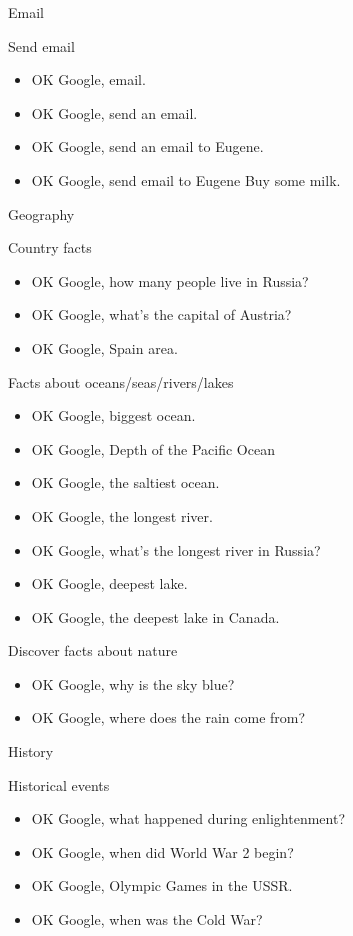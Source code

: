 \documentclass[
  a4paper,
]{article}
\begin{document}
Email

Send email

\begin{itemize}
\item
  OK Google, email.
\item
  OK Google, send an email.
\item
  OK Google, send an email to Eugene.
\item
  OK Google, send email to Eugene Buy some milk.
\end{itemize}

Geography

Country facts

\begin{itemize}
\item
  OK Google, how many people live in Russia?
\item
  OK Google, what's the capital of Austria?
\item
  OK Google, Spain area.
\end{itemize}

Facts about oceans/seas/rivers/lakes

\begin{itemize}
\item
  OK Google, biggest ocean.
\item
  OK Google, Depth of the Pacific Ocean
\item
  OK Google, the saltiest ocean.
\item
  OK Google, the longest river.
\item
  OK Google, what's the longest river in Russia?
\item
  OK Google, deepest lake.
\item
  OK Google, the deepest lake in Canada.
\end{itemize}

Discover facts about nature

\begin{itemize}
\item
  OK Google, why is the sky blue?
\item
  OK Google, where does the rain come from?
\end{itemize}

History

Historical events

\begin{itemize}
\item
  OK Google, what happened during enlightenment?
\item
  OK Google, when did World War 2 begin?
\item
  OK Google, Olympic Games in the USSR.
\item
  OK Google, when was the Cold War?
\end{itemize}
\end{document}

